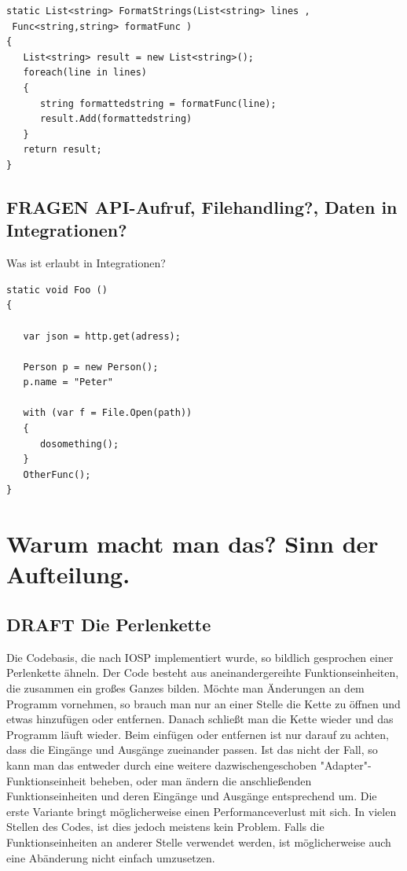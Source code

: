 \documentclass[a4paper,12pt,oneside]{book}
\begin{document}
\begin{verbatim}
static List<string> FormatStrings(List<string> lines ,
 Func<string,string> formatFunc )
{
   List<string> result = new List<string>();
   foreach(line in lines)
   {
      string formattedstring = formatFunc(line);
      result.Add(formattedstring)
   }
   return result;
}
\end{verbatim}


\subsection{FRAGEN API-Aufruf, Filehandling?, Daten in Integrationen?}
\label{sec-4-5-2}

Was ist erlaubt in Integrationen?

\begin{verbatim}
static void Foo ()
{

   var json = http.get(adress);

   Person p = new Person();
   p.name = "Peter"

   with (var f = File.Open(path))
   {
      dosomething();
   }
   OtherFunc();
}
\end{verbatim}

\section{Warum macht man das? Sinn der Aufteilung.}
\label{sec-4-6}
\subsection{DRAFT Die Perlenkette}
\label{sec-4-6-1}
Die Codebasis, die nach IOSP implementiert wurde, so bildlich gesprochen einer
Perlenkette ähneln. Der Code besteht aus aneinandergereihte Funktionseinheiten,
die zusammen ein großes Ganzes bilden. Möchte man Änderungen an dem Programm
vornehmen, so brauch man nur an einer Stelle die Kette zu öffnen und etwas
hinzufügen oder entfernen. Danach schließt man die Kette wieder und das Programm
läuft wieder. Beim einfügen oder entfernen ist nur darauf zu achten, dass die
Eingänge und Ausgänge zueinander passen. Ist das nicht der Fall, so kann man das
entweder durch eine weitere dazwischengeschoben "Adapter"-Funktionseinheit
beheben, oder man ändern die anschließenden Funktionseinheiten und deren
Eingänge und Ausgänge entsprechend um.
Die erste Variante bringt möglicherweise einen Performanceverlust mit sich.
In vielen Stellen des Codes, ist dies jedoch meistens kein Problem.
Falls die Funktionseinheiten an anderer Stelle verwendet werden, ist
möglicherweise auch eine Abänderung nicht einfach umzusetzen.
\end{document}

